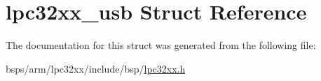 \hypertarget{structlpc32xx__usb}{}\section{lpc32xx\+\_\+usb Struct Reference}
\label{structlpc32xx__usb}


The documentation for this struct was generated from the following file\+:\begin{DoxyCompactItemize}
\item 
bsps/arm/lpc32xx/include/bsp/\mbox{\hyperlink{lpc32xx_8h}{lpc32xx.\+h}}\end{DoxyCompactItemize}
